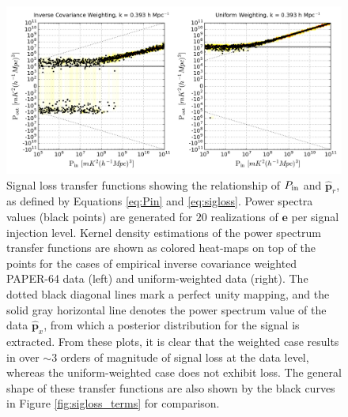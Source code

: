 \documentclass[preprint2,numberedappendix,tighten]{aastex6}  %
\newcommand{\cc}[1]{{\color{purple} \textbf{[CC: #1]}}}
\begin{document}
\begin{figure}
	\centering
	\includegraphics[width=1\textwidth]{plots/sigloss_transfercurve_posneg.png}
	\caption{Signal loss transfer functions showing the relationship of $P_{\rm in}$ and $\widehat{\textbf{p}}_{r}$, as defined by Equations \eqref{eq:Pin} and \eqref{eq:sigloss}. Power spectra values (black points) are generated for $20$ realizations of $\textbf{e}$ per signal injection level. Kernel density estimations of the power spectrum transfer functions are shown as colored 
heat-maps on top of the points for the cases of empirical inverse covariance weighted PAPER-64 data (left) and uniform-weighted data (right). The dotted black 
diagonal lines mark a perfect unity mapping, and the solid gray horizontal line denotes the power spectrum value of the data $\widehat{\textbf{p}}_{x}$, from which a posterior distribution for the signal is extracted. From these plots, it is clear that the weighted case results in over $\sim3$ orders of magnitude of signal loss at the data level, whereas the uniform-weighted case does 
not exhibit loss. The general shape of these transfer functions are also shown by the black curves in Figure \ref{fig:sigloss_terms} for comparison.}
	\label{fig:sigloss_transfercurve}
\end{figure}

%
\end{document}
